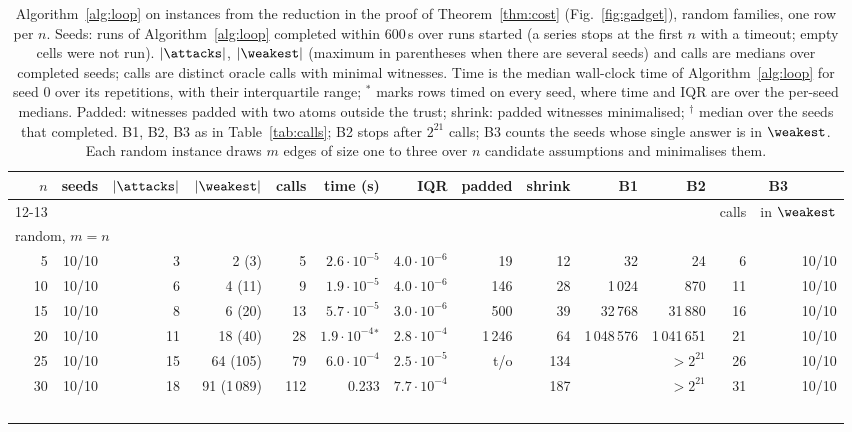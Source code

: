 \begin{table}[p]
\caption{Algorithm~\ref{alg:loop} on instances from the reduction in the proof of Theorem~\ref{thm:cost} (Fig.~\ref{fig:gadget}), random families, one row per $n$. Seeds: runs of Algorithm~\ref{alg:loop} completed within 600\,s over runs started (a series stops at the first $n$ with a timeout; empty cells were not run). $|\attacks|$, $|\weakest|$ (maximum in parentheses when there are several seeds) and calls are medians over completed seeds; calls are distinct oracle calls with minimal witnesses. Time is the median wall-clock time of Algorithm~\ref{alg:loop} for seed 0 over its repetitions, with their interquartile range; $^{*}$ marks rows timed on every seed, where time and IQR are over the per-seed medians. Padded: witnesses padded with two atoms outside the trust; shrink: padded witnesses minimalised; $^{\dagger}$ median over the seeds that completed. B1, B2, B3 as in Table~\ref{tab:calls}; B2 stops after $2^{21}$ calls; B3 counts the seeds whose single answer is in $\weakest$. Each random instance draws $m$ edges of size one to three over $n$ candidate assumptions and minimalises them.}
\label{tab:scale}
\centering
\setlength{\tabcolsep}{2.6pt}
\scriptsize
\begin{tabular}{r r r r r r r r r r r r r}
\toprule
$n$ & seeds & $|\attacks|$ & $|\weakest|$ & calls & time (s) & IQR & padded & shrink & B1 & B2 & \multicolumn{2}{c}{B3}\\
\cmidrule(lr){12-13}
 & & & & & & & & & & & calls & in $\weakest$\\
\midrule
\multicolumn{13}{l}{random, $m=n$}\\
5 & 10/10 & 3 & 2 (3) & 5 & $2.6{\cdot}10^{-5}$ & $4.0{\cdot}10^{-6}$ & 19 & 12 & 32 & 24 & 6 & 10/10\\
10 & 10/10 & 6 & 4 (11) & 9 & $1.9{\cdot}10^{-5}$ & $4.0{\cdot}10^{-6}$ & 146 & 28 & 1\,024 & 870 & 11 & 10/10\\
15 & 10/10 & 8 & 6 (20) & 13 & $5.7{\cdot}10^{-5}$ & $3.0{\cdot}10^{-6}$ & 500 & 39 & 32\,768 & 31\,880 & 16 & 10/10\\
20 & 10/10 & 11 & 18 (40) & 28 & $1.9{\cdot}10^{-4}$$^{*}$ & $2.8{\cdot}10^{-4}$ & 1\,246 & 64 & 1\,048\,576 & 1\,041\,651 & 21 & 10/10\\
25 & 10/10 & 15 & 64 (105) & 79 & $6.0{\cdot}10^{-4}$ & $2.5{\cdot}10^{-5}$ & t/o & 134 &  & $>2^{21}$ & 26 & 10/10\\
30 & 10/10 & 18 & 91 (1\,089) & 112 & 0.233 & $7.7{\cdot}10^{-4}$ &  & 187 &  & $>2^{21}$ & 31 & 10/10\\
$$
\end{tabular}
\end{table}
